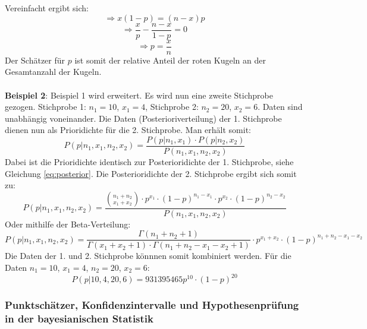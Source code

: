 \documentclass[a4paper,12pt]{article}
\begin{document}
Vereinfacht ergibt sich:
\begin{equation}
\Rightarrow x(1-p) = (n-x)p
\end{equation}
\begin{equation}  
\Rightarrow \frac{x}{p} - \frac{n-x}{1-p} = 0
\end{equation}
\begin{equation}
\Rightarrow p = \frac{x}{n}
\end{equation}
Der Schätzer für $p$ ist somit der relative Anteil der roten Kugeln an der Gesamtanzahl der Kugeln. \\\\
\textbf{Beispiel 2}: Beispiel 1 wird erweitert. Es wird nun eine zweite Stichprobe gezogen. 
Stichprobe 1: $n_1 = 10$, $x_1 = 4$, Stichprobe 2: $n_2 = 20$, $x_2 = 6$.
Daten sind unabhängig voneinander. Die Daten (Posterioriverteilung) der 1. Stichprobe dienen nun
als Prioridichte für die 2. Stichprobe. Man erhält somit:
\begin{equation}
P(p|n_1,x_1,n_2,x_2) = \frac{P(p|n_1,x_1) \cdot P(p|n_2,x_2)}{P(n_1,x_1,n_2,x_2)}
\end{equation}
Dabei ist die Prioridichte identisch zur Posterioridichte der 1. Stichprobe, siehe Gleichung \eqref{eq:posterior}.
Die Posterioridichte der 2. Stichprobe ergibt sich somit zu:
\begin{equation}
P(p|n_1,x_1,n_2,x_2) = \frac{\binom{n_1+n_2}{x_1+x_2} \cdot p^{x_1} \cdot (1-p)^{n_1-x_1} \cdot p^{x_2} \cdot (1-p)^{n_2-x_2}}{P(n_1,x_1,n_2,x_2)}
\end{equation}
Oder mithilfe der Beta-Verteilung:
\begin{equation}
  P(p|n_1,x_1,n_2,x_2) = \frac{\Gamma(n_1+n_2+1)}{\Gamma(x_1+x_2+1)\cdot\Gamma(n_1+n_2-x_1-x_2+1)} \cdot p^{x_1+x_2} \cdot (1-p)^{n_1+n_2-x_1-x_2}
\end{equation}
Die Daten der 1. und 2. Stichprobe könnnen somit kombiniert werden.
Für die Daten $n_1 = 10$, $x_1 = 4$, $n_2 = 20$, $x_2 = 6$:
\begin{equation}
P(p|10,4,20,6) = 931 395 465p^{10} \cdot (1-p)^{20}
\end{equation}

\subsubsection{Punktschätzer, Konfidenzintervalle und Hypothesenprüfung in der bayesianischen Statistik}
\end{document}
